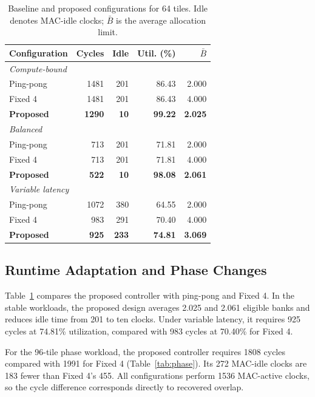 \documentclass[twocolumn,10pt]{article}
\begin{document}
\begin{table}[t]
\centering\caption{Baseline and proposed configurations for 64 tiles.
Idle denotes MAC-idle clocks; $\bar B$ is the average allocation limit.}
\label{tab:runtime}\scriptsize
\begin{tabular}{lrrrr}
\toprule
Configuration & Cycles & Idle & Util. (\%) & $\bar B$\\
\midrule
\multicolumn{5}{l}{\textit{Compute-bound}}\\
Ping-pong & 1481 & 201 & 86.43 & 2.000\\
Fixed 4 & 1481 & 201 & 86.43 & 4.000\\
\textbf{Proposed} & \textbf{1290} & \textbf{10} & \textbf{99.22} & \textbf{2.025}\\
\midrule
\multicolumn{5}{l}{\textit{Balanced}}\\
Ping-pong & 713 & 201 & 71.81 & 2.000\\
Fixed 4 & 713 & 201 & 71.81 & 4.000\\
\textbf{Proposed} & \textbf{522} & \textbf{10} & \textbf{98.08} & \textbf{2.061}\\
\midrule
\multicolumn{5}{l}{\textit{Variable latency}}\\
Ping-pong & 1072 & 380 & 64.55 & 2.000\\
Fixed 4 & 983 & 291 & 70.40 & 4.000\\
\textbf{Proposed} & \textbf{925} & \textbf{233} & \textbf{74.81} & \textbf{3.069}\\
\bottomrule
\end{tabular}
\end{table}

\subsection{Runtime Adaptation and Phase Changes}
Table~\ref{tab:runtime} compares the proposed controller with ping-pong
and Fixed 4. In the stable workloads, the proposed design averages
2.025 and 2.061 eligible banks and reduces idle time from 201 to ten
clocks. Under variable latency, it requires 925 cycles at 74.81\%
utilization, compared with 983 cycles at 70.40\% for Fixed 4.

For the 96-tile phase workload, the proposed controller requires 1808
cycles compared with 1991 for Fixed 4 (Table~\ref{tab:phase}). Its 272
MAC-idle clocks are 183 fewer than Fixed 4's 455. All configurations perform
1536 MAC-active clocks, so the cycle difference corresponds directly to
recovered overlap.
\end{document}
